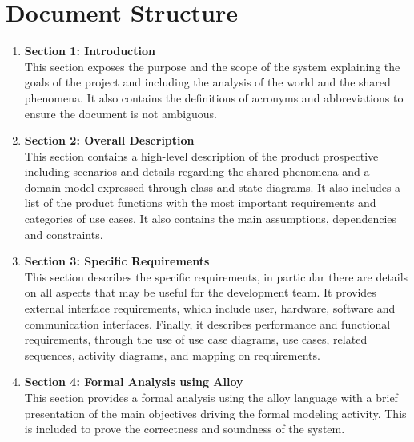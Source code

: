 \section{Document Structure}

\begin{enumerate}
    \item \textbf{Section 1: Introduction} \\
          This section exposes the purpose and the scope of the system explaining the goals of the project and including the analysis of the world and the shared phenomena.
          It also contains the definitions of acronyms and abbreviations to ensure the document is not ambiguous.
    \item \textbf{Section 2: Overall Description} \\
          This section contains a high-level description of the product prospective including scenarios and details regarding the shared phenomena and a domain model expressed through class and state diagrams. It also includes a list of the product functions with the most important requirements and categories of use cases. It also contains the main assumptions, dependencies and constraints.
          
    \item \textbf{Section 3: Specific Requirements} \\
          This section describes the specific requirements, in particular there are details on all aspects that may be useful for the development team.
          It provides external interface requirements, which include user, hardware, software and communication interfaces.
          Finally, it describes performance and functional requirements, through the use of use case diagrams, use cases, related sequences, activity diagrams, and mapping on requirements.
    \item \textbf{Section 4: Formal Analysis using Alloy} \\
        This section provides a formal analysis using the alloy language with a brief presentation of the main objectives driving the formal modeling activity. This is included to prove the correctness and soundness of the system.
\end{enumerate}
